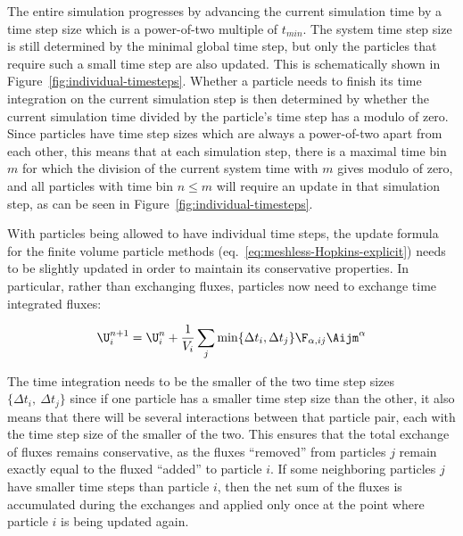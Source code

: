 The entire simulation progresses by advancing the current simulation time by a time step size which
is a power-of-two multiple of $t_{min}$. The system time step size is still determined by the
minimal global time step, but only the particles that require such a small time step are also
updated. This is schematically shown in Figure~\ref{fig:individual-timesteps}. Whether a particle
needs to finish its time integration on the current simulation step is then determined by whether
the current simulation time divided by the particle's time step has a modulo of zero. Since
particles have time step sizes which are always a power-of-two apart from each other, this means
that at each simulation step, there is a maximal time bin $m$ for which the division of the current
system time with $m$ gives modulo of zero, and all particles with time bin $n \leq m$ will require
an update in that simulation step, as can be seen in Figure~\ref{fig:individual-timesteps}.

With particles being allowed to have individual time steps, the update formula for the finite volume
particle methods (eq.~\ref{eq:meshless-Hopkins-explicit}) needs to be slightly updated in order to
maintain its conservative properties. In particular, rather than exchanging fluxes, particles now
need to exchange time integrated fluxes:

\begin{align}
\U_i^{n+1} =
    \U_i^n + \frac{1}{V_i} \sum_j \min\{ \Delta t_i, \Delta t_j \} \F_{\alpha, ij} \Aijm^\alpha
\label{eq:meshless-explicit-individual-timesteps}
\end{align}

The time integration needs to be the smaller of the two time step sizes $\{\Delta t_i,\  \Delta
t_j\}$ since if one particle has a smaller time step size than the other, it also means that there
will be several interactions between that particle pair, each with the time step size of the smaller
of the two. This ensures that the total exchange of fluxes remains conservative, as the fluxes
``removed'' from particles $j$ remain exactly equal to the fluxed ``added'' to particle $i$. If some
neighboring particles $j$ have smaller time steps than particle $i$, then the net sum of the fluxes
is accumulated during the exchanges and applied only once at the point where particle $i$ is being
updated again.





